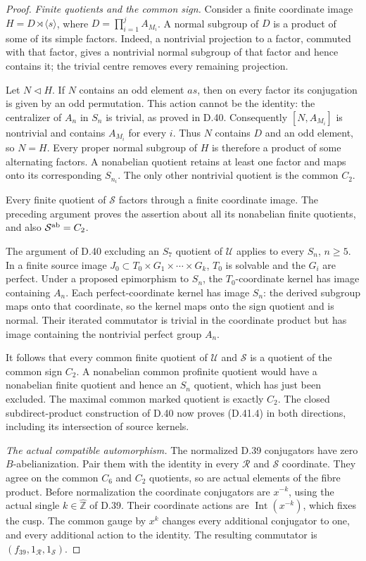 \begin{proof}
\emph{Finite quotients and the common sign.}
Consider a finite coordinate image
$H=D\rtimes\langle s\rangle$, where
$D=\prod_{i=1}^j A_{M_i}$. A normal subgroup of
$D$ is a product of some of its simple factors.
Indeed, a nontrivial projection to a factor,
commuted with that factor, gives a nontrivial
normal subgroup of that factor and hence
contains it; the trivial centre removes every
remaining projection.

Let $N\lhd H$. If $N$ contains an odd element
$a s$, then on every factor its conjugation
is given by an odd permutation. This action
cannot be the identity: the centralizer of
$A_n$ in $S_n$ is trivial, as proved in D.40.
Consequently $[N,A_{M_i}]$ is nontrivial and
contains $A_{M_i}$ for every $i$. Thus $N$
contains $D$ and an odd element, so $N=H$.
Every proper normal subgroup of $H$ is therefore
a product of some alternating factors.
A nonabelian quotient retains at least one
factor and maps onto its corresponding
$S_{n_i}$. The only other nontrivial quotient
is the common $C_2$.

Every finite quotient of $\mathcal S$ factors
through a finite coordinate image. The preceding
argument proves the assertion about all its
nonabelian finite quotients, and also
$\mathcal S^{\rm ab}=C_2$.

The argument of D.40 excluding an $S_7$ quotient
of $\mathcal U$ applies to every $S_n$, $n\ge5$.
In a finite source image
$J_0\subset T_0\times G_1\times\cdots\times G_k$,
$T_0$ is solvable and the $G_i$ are perfect.
Under a proposed epimorphism to $S_n$, the
$T_0$-coordinate kernel has image containing
$A_n$. Each perfect-coordinate kernel has
image $S_n$: the derived subgroup maps onto
that coordinate, so the kernel maps onto the
sign quotient and is normal. Their iterated
commutator is trivial in the coordinate
product but has image containing the
nontrivial perfect group $A_n$.

It follows that every common finite quotient
of $\mathcal U$ and $\mathcal S$ is a quotient
of the common sign $C_2$. A nonabelian common
profinite quotient would have a nonabelian
finite quotient and hence an $S_n$ quotient,
which has just been excluded. The maximal
common marked quotient is exactly $C_2$.
The closed subdirect-product construction of
D.40 now proves (D.41.4) in both directions,
including its intersection of source kernels.

\emph{The actual compatible automorphism.}
The normalized D.39 conjugators have zero
$B$-abelianization. Pair them with the identity
in every $\mathcal R$ and $\mathcal S$ coordinate.
They agree on the common $C_6$ and $C_2$ quotients,
so are actual elements of the fibre product.
Before normalization the coordinate conjugators
are $x^{-k}$, using the actual single
$k\in\widehat{\mathbb Z}$ of D.39. Their coordinate
actions are $\operatorname{Int}(x^{-k})$, which
fixes the cusp. The common gauge by $x^k$
changes every additional conjugator to one,
and every additional action to the identity.
The resulting commutator is
$(f_{39},1_{\mathcal R},1_{\mathcal S})$.


\end{proof}
